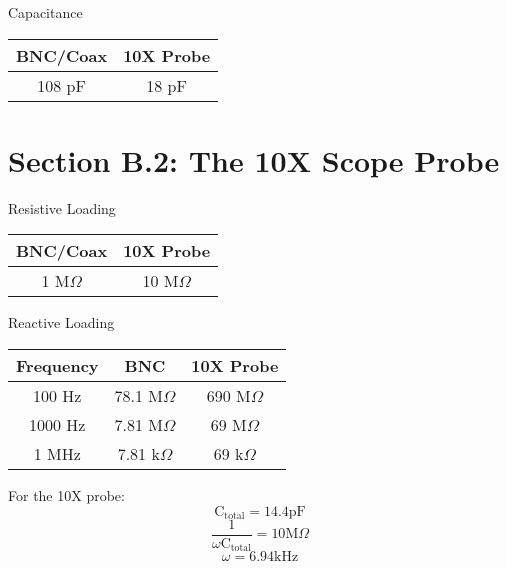 \documentclass[12pt,letterpaper]{report}
\begin{document}
\begin{center}

Capacitance\\
	\begin{tabular}{| c | c |}
	\hline
	
	BNC/Coax & 10X Probe \\
	\hline
	108 pF & 18 pF \\

	\hline
	\end{tabular}
\end{center}

\section*{Section B.2: The 10X Scope Probe}

\begin{center}
Resistive Loading\\
	\begin{tabular}{| c | c |}
	\hline
	
	BNC/Coax & 10X Probe \\
	\hline
	1 M$\Omega $ & 10 M$\Omega$ \\

	\hline
	\end{tabular}
\end{center}

\begin{center}
Reactive Loading\\
	\begin{tabular}{| c | c | c |}
	\hline
	
	Frequency & BNC & 10X Probe \\
	\hline
	100 Hz & 78.1 M$\Omega$ & 690 M$\Omega$\\
	1000 Hz & 7.81 M$\Omega$ & 69 M$\Omega$\\
	1 MHz & 7.81 k$\Omega$ & 69 k$\Omega$\\
	
	\hline
	\end{tabular}
\end{center}

For the 10X probe:
$$\text{C}_{\text{total}} = 14.4 \text{pF}$$
$$ \frac{1}{\omega \text{C}_{\text{total}}} = 10\text{M}\Omega$$
$$ \omega = 6.94 \text{kHz} $$
\end{document}
